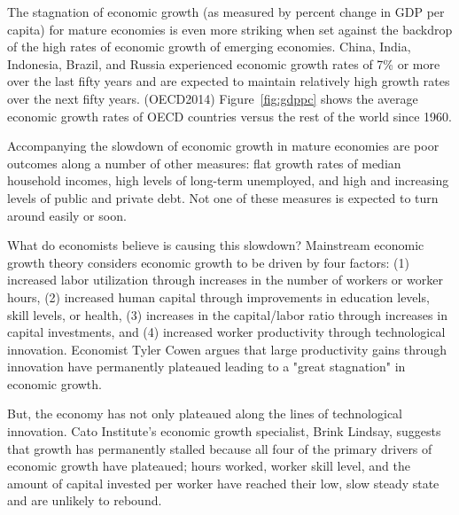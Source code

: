 The stagnation of economic growth (as measured by percent change in GDP per capita) for mature economies is even more striking when set against the backdrop of the high rates of economic growth of emerging economies. China, India, Indonesia, Brazil, and Russia experienced economic growth rates of 7\% or more over the last fifty years and are expected to maintain relatively high growth rates over the next fifty years. (OECD2014) Figure~\ref{fig:gdppc} shows the average economic growth rates of OECD countries versus the rest of the world since 1960.

Accompanying the slowdown of economic growth in mature economies are poor outcomes along a number of other measures: flat growth rates of median household incomes, high levels of long-term unemployed, and high and increasing levels of public and private debt. Not one of these measures is expected to turn around easily or soon.

What do economists believe is causing this slowdown? Mainstream economic growth theory considers economic growth to be driven by four factors: (1) increased labor utilization through increases in the number of workers or worker hours, (2) increased human capital through improvements in education levels, skill levels, or health, (3) increases in the capital/labor ratio through increases in capital investments, and (4) increased worker productivity through technological innovation. Economist Tyler Cowen argues that large productivity gains through innovation have permanently plateaued leading to a "great stagnation" in economic growth.\cite{Cowen2011}


But, the economy has not only plateaued along the lines of technological innovation. Cato Institute's economic growth specialist, Brink Lindsay, suggests that growth has permanently stalled because all four of the primary drivers of economic growth have plateaued; hours worked, worker skill level, and the amount of capital invested per worker have reached their low, slow steady state and are unlikely to rebound.\cite{lindsay2013} 






